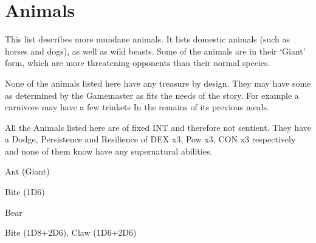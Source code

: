 \clearpage

\section{Animals}

This list describes more mundane animals. It lists domestic animals (such as horses and dogs), as well as wild beasts. Some of the animals are in their ‘Giant’ form, which are more threatening opponents than their normal species.

None of the animals listed here have any treasure by design. They may have some as determined by the Gamemaster as fits the needs of the story. For example a carnivore may have a few trinkets In the remains of its previous meals.

All the Animals listed here are of fixed INT and therefore not sentient. They have a Dodge, Persistence and Resilience of DEX x3, Pow x3, CON x3 respectively and none of them know have any supernatural abilities.

\vspace{1em}

\begin{samepage}
\begin{monsterbox}{Ant (Giant)}
	\basics[%
        hitpoints  = 12, 
	majorwound = 6,
	damagemodifier = 0,
	powerpoints = 6,
	movementrate = 15m,
	armor = Chitin (5 AP),
	]
	\rpghline%
	\stats[ %
		STR = 4D6   (14),
		CON = 3D6+6 (17),
		DEX = 2D6+6 (13),
		SIZ = 2D6   (7),
		INT = 2     (2),
		POW = 1D6+3 (6),
		CHA = 5     (5)
	]
	\rpghline%
	\begin{rpg-monsteraction}
		Bite (1D6)
	\end{rpg-monsteraction}
\end{monsterbox}
\end{samepage}


\begin{samepage}
\begin{monsterbox}{Bear}
	\basics[%
        hitpoints  = 19, 
	majorwound = 10,
	damagemodifier = 0,
	powerpoints = 11,
	movementrate = 23m,
	armor = Tough hide (3 AP),
	]
	\rpghline%
	\stats[ %
		STR = 3D6+15 (25),
		CON = 2D6+6  (13),
		DEX = 3D6    (11),
		SIZ = 3D6+15 (25),
		INT = 5     (5),
		POW = 3D6   (11),
		CHA = 5     (5)
	]
	\rpghline%
	\begin{rpg-monsteraction}
		Bite (1D8+2D6), Claw (1D6+2D6)
	\end{rpg-monsteraction}
\end{monsterbox}
\end{samepage}

